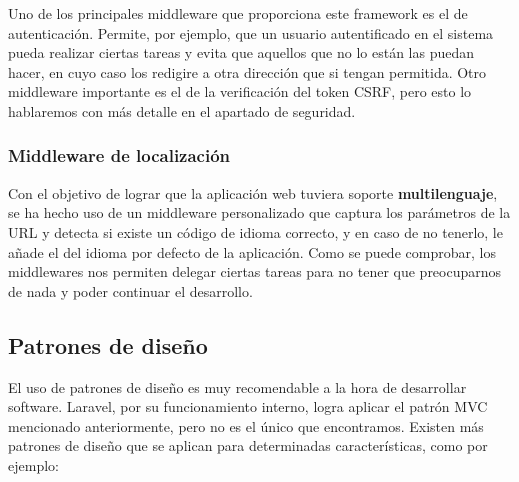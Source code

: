 Uno de los principales middleware que proporciona este framework es el de autenticación. Permite, por ejemplo, que un usuario autentificado en el sistema pueda realizar ciertas tareas y evita que aquellos que no lo están las puedan hacer, en cuyo caso los redigire a otra dirección que si tengan permitida. Otro middleware importante es el de la verificación del token CSRF, pero esto lo hablaremos con más detalle en el apartado de seguridad.

\subsubsection{Middleware de localización}
Con el objetivo de lograr que la aplicación web tuviera soporte \textbf{multilenguaje}, se ha hecho uso de un middleware personalizado que captura los parámetros de la URL y detecta si existe un código de idioma correcto, y en caso de no tenerlo, le añade el del idioma por defecto de la aplicación. Como se puede comprobar, los middlewares nos permiten delegar ciertas tareas para no tener que preocuparnos de nada y poder continuar el desarrollo.

\subsection{Patrones de diseño}
El uso de patrones de diseño es muy recomendable a la hora de desarrollar software. Laravel, por su funcionamiento interno, logra aplicar el patrón MVC mencionado anteriormente, pero no es el único que encontramos. Existen más patrones de diseño que se aplican para determinadas características, como por ejemplo:

